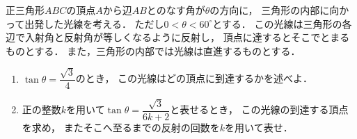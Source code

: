 \documentclass[../../main.tex]{subfiles}
\begin{document}
正三角形$ABC$の頂点$A$から辺$AB$とのなす角が$\theta$の方向に，
三角形の内部に向かって出発した光線を考える．
ただし$0<\theta<{60}^\circ$とする．
この光線は三角形の各辺で入射角と反射角が等しくなるように反射し，
頂点に達するとそこでとまるものとする．
また，三角形の内部では光線は直進するものとする．
\begin{enumerate}
  \item $\displaystyle\tan\theta=\dfrac{\sqrt3}{4}$のとき，
    この光線はどの頂点に到達するかを述べよ．
  \item 正の整数$k$を用いて$\displaystyle\tan\theta=\dfrac{\sqrt3}{6k+2}$と表せるとき，
    この光線の到達する頂点を求め，
    またそこへ至るまでの反射の回数を$k$を用いて表せ．
\end{enumerate}
\end{document}
